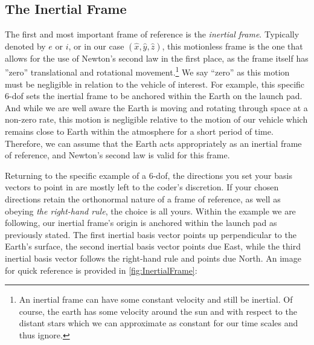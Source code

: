\documentclass[12pt]{report}
\begin{document}
\subsection{The Inertial Frame}
The first and most important frame of reference is the \textit{inertial frame}. Typically denoted by $e$ or $i$, or in our case $(\hat{x},\hat{y},\hat{z})$, this motionless frame is the one that allows for the use of Newton’s second law in the first place, as the frame itself has ''zero'' translational and rotational movement.\footnote{An inertial frame can have some constant velocity and still be inertial. Of course, the earth has some velocity around the sun and with respect to the distant stars which we can approximate as constant for our time scales and thus ignore.} We say “zero” as this motion must be negligible in relation to the vehicle of interest. For example, this specific 6-\gls{dof} sets the inertial frame to be anchored within the Earth on the launch pad. And while we are well aware the Earth is moving and rotating through space at a non-zero rate, this motion is negligible relative to the motion of our vehicle which remains close to Earth within the atmosphere for a short period of time. Therefore, we can assume that the Earth acts appropriately as an inertial frame of reference, and Newton’s second law is valid for this frame. 

Returning to the specific example of a 6-\gls{dof}, the directions you set your basis vectors to point in are mostly left to the coder’s discretion. If your chosen directions retain the orthonormal nature of a frame of reference, as well as obeying \textit{the right-hand rule}, the choice is all yours. Within the example we are following, our inertial frame’s origin is anchored within the launch pad as previously stated. The first inertial basis vector points up perpendicular to the Earth’s surface, the second inertial basis vector points due East, while the third inertial basis vector follows the right-hand rule and points due North. An image for quick reference is provided in \ref{fig:InertialFrame}:
\end{document}
